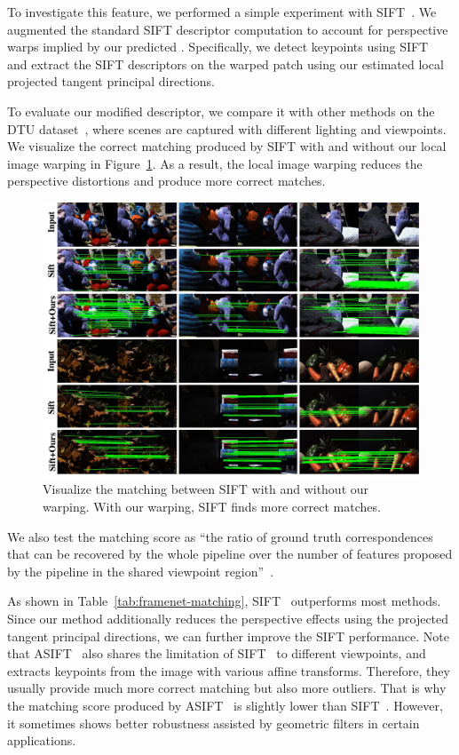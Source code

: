 To investigate this feature, we performed a simple experiment with SIFT~\cite{lowe2004distinctive}.  We augmented the standard SIFT descriptor computation to account for perspective warps implied by our predicted \cframes. Specifically, we detect keypoints using SIFT~\cite{lowe2004distinctive} and extract the SIFT descriptors on the warped patch using our estimated local projected tangent principal directions.

To evaluate our modified descriptor, we compare it with other methods on the DTU dataset~\cite{aanaes2012interesting}, where scenes are captured with different lighting and viewpoints. We visualize the correct matching produced by SIFT with and without our local image warping in Figure~\ref{fig:framenet-dtu-vis}. As a result, the local image warping reduces the perspective distortions and produce more correct matches.
\begin{figure}
    \centering
    \includegraphics[width=0.8\linewidth]{FrameNet/graph/vis-sift.pdf}
    \caption{Visualize the matching between SIFT with and without our warping. With our warping, SIFT finds more correct matches.}
    \label{fig:framenet-dtu-vis}
\end{figure}
We also test the matching score as ``the ratio of ground truth correspondences that can be recovered by the whole pipeline over the number of features proposed by the pipeline in the shared viewpoint region''~\cite{yi2016lift}.

As shown in Table~\ref{tab:framenet-matching}, SIFT~\cite{lowe2004distinctive} outperforms most methods. Since our method additionally reduces the perspective effects using the projected tangent principal directions, we can further improve the SIFT performance. Note that ASIFT~\cite{yu2011asift} also shares the limitation of SIFT~\cite{lowe2004distinctive} to different viewpoints, and extracts keypoints from the image with various affine transforms. Therefore, they usually provide much more correct matching but also more outliers. That is why the matching score produced by ASIFT~\cite{yu2011asift} is slightly lower than SIFT~\cite{lowe2004distinctive}. However, it sometimes shows better robustness assisted by geometric filters in certain applications.

